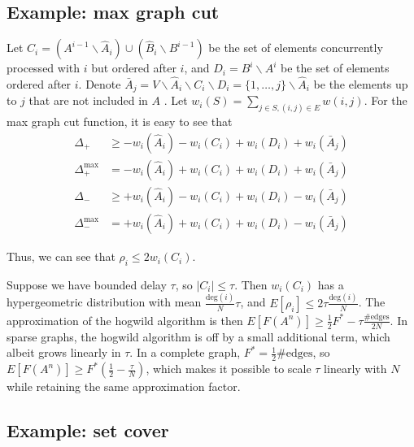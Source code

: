 \subsection{Example: max graph cut}
Let $C_i = (A^{i-1}\backslash \hat{A}_i) \cup (\hat{B}_i\backslash B^{i-1})$ be the set of elements concurrently processed with $i$ but ordered after $i$, and $D_i = B^i\backslash A^i$ be the set of elements ordered after $i$.
Denote $\bar{A}_j = V\backslash \hat{A}_i\backslash C_i\backslash D_i = \{1,\dots,j\}\backslash \hat{A}_i$ be the elements up to $j$ that are not included in $A$ . 
Let $w_i(S) = \sum_{j\in S, (i,j)\in E} w(i,j)$.
For the max graph cut function, it is easy to see that 
\begin{align*}
\Delta_+        &\geq - w_i(\hat{A}_i) -w_i(C_i) + w_i(D_i) + w_i(\bar{A}_j)\\
\Delta_+^{\max} &=    - w_i(\hat{A}_i) + w_i(C_i) + w_i(D_i) + w_i(\bar{A}_j)\\
\Delta_-        &\geq + w_i(\hat{A}_i) - w_i(C_i) + w_i(D_i) - w_i(\bar{A}_j)\\
\Delta_-^{\max} &= + w_i(\hat{A}_i) + w_i(C_i) + w_i(D_i) - w_i(\bar{A}_j)
\end{align*}

Thus, we can see that $\rho_i \leq 2w_i(C_i)$.

Suppose we have bounded delay $\tau$, so $|C_i| \leq \tau$.
Then $w_i(C_i)$ has a hypergeometric distribution with mean $\frac{\text{deg}(i)}{N}\tau$, and $E[\rho_i] \leq 2\tau\frac{\text{deg}(i)}{N}$.
The approximation of the hogwild algorithm is then $E[F(A^n)] \geq \frac{1}{2} F^* - \tau\frac{\#\text{edges}}{2N}$.
In sparse graphs, the hogwild algorithm is off by a small additional term, which albeit grows linearly in $\tau$.
In a complete graph, $F^* = \frac{1}{2}\#\text{edges}$, so $E[F(A^n)] \geq F^*\left(\frac{1}{2} - \frac{\tau}{N}\right)$, which makes it possible to scale $\tau$ linearly with $N$ while retaining the same approximation factor.



\subsection{Example: set cover}

